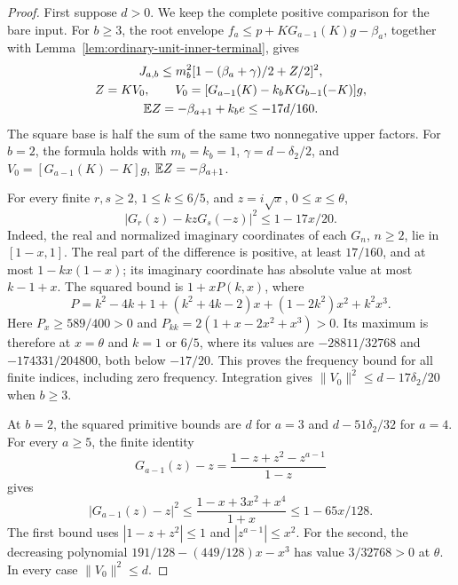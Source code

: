 \begin{proof}
First suppose \(d>0\). We keep the complete positive comparison for the bare input.
For \(b\ge3\), the root envelope
\(f_a\le p+KG_{a-1}(K)g-\beta_a\), together with
Lemma~\ref{lem:ordinary-unit-inner-terminal}, gives
\begin{equation}\label{eq:ordinary-unit-inner:square}
\begin{gathered}
 J_{a,b}\le m_b^2[1-(\beta_a+\gamma)/2+Z/2]^2,\\
 Z=KV_0,\qquad
 V_0=[G_{a-1}(K)-k_bKG_{b-1}(-K)]g,\\
 \mathbb E Z=-\beta_{a+1}+k_be\le-17d/160.
\end{gathered}
\end{equation}
The square base is half the sum of the same two nonnegative upper
factors. For \(b=2\), the formula holds with
\(m_b=k_b=1\), \(\gamma=d-\delta_2/2\), and
\(V_0=[G_{a-1}(K)-K]g\), \(\mathbb E Z=-\beta_{a+1}\).

For every finite \(r,s\ge2\), \(1\le k\le6/5\),
and \(z=i\sqrt x\), \(0\le x\le\theta\),
\begin{equation}\label{eq:ordinary-unit-inner:correlated-frequency}
 |G_r(z)-kzG_s(-z)|^2\le1-17x/20.
\end{equation}
Indeed, the real and normalized imaginary coordinates of each
\(G_n\), \(n\ge2\), lie in \([1-x,1]\).
The real part of the difference is positive, at least \(17/160\),
and at most \(1-kx(1-x)\); its imaginary coordinate has absolute
value at most \(k-1+x\). The squared bound is \(1+xP(k,x)\), where
\[
 P=k^2-4k+1+(k^2+4k-2)x+(1-2k^2)x^2+k^2x^3.
\]
Here \(P_x\ge589/400>0\) and
\(P_{kk}=2(1+x-2x^2+x^3)>0\). Its maximum is therefore at
\(x=\theta\) and \(k=1\) or \(6/5\), where its values are
\(-28811/32768\) and \(-174331/204800\), both below \(-17/20\).
This proves the frequency bound for all finite indices, including
zero frequency. Integration gives
\(\|V_0\|^2\le d-17\delta_2/20\) when \(b\ge3\).

At \(b=2\), the squared primitive bounds are
\(d\) for \(a=3\) and \(d-51\delta_2/32\) for \(a=4\).
For every \(a\ge5\), the finite identity
\[
 G_{a-1}(z)-z=\frac{1-z+z^2-z^{a-1}}{1-z}
\]
gives
\begin{equation}\label{eq:ordinary-unit-inner:tail-frequency}
 |G_{a-1}(z)-z|^2
 \le\frac{1-x+3x^2+x^4}{1+x}\le1-65x/128.
\end{equation}
The first bound uses \(|1-z+z^2|\le1\) and \(|z^{a-1}|\le x^2\).
For the second, the decreasing polynomial
\(191/128-(449/128)x-x^3\) has value \(3/32768>0\) at \(\theta\).
In every case \(\|V_0\|^2\le d\).


\end{proof}
